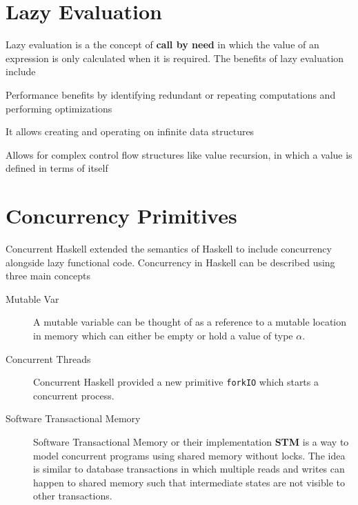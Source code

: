 \section{Lazy Evaluation}
Lazy evaluation is a the concept of \textbf{call by need} in which the value of an expression is only calculated when it is required.
The benefits of lazy evaluation include
\begin{packed_itemize}
\item Performance benefits by identifying redundant or repeating computations and performing optimizations
\item It allows creating and operating on infinite data structures
\item Allows for complex control flow structures like value recursion, in which a value is defined in terms of itself
\end{packed_itemize}

\section{Concurrency Primitives}
Concurrent Haskell\cite{jones1996concurrent} extended the semantics of Haskell to include concurrency alongside lazy functional code.
Concurrency in Haskell can be described using three main concepts
\begin{description}
\item[Mutable Var] A mutable variable can be thought of as a reference to a mutable location in memory which can either be empty or hold
a value of type \textbf{$\alpha$}.
\item[Concurrent Threads] Concurrent Haskell provided a new primitive \texttt{forkIO} which starts a concurrent process.
\item[Software Transactional Memory] Software Transactional Memory or their implementation \textbf{STM}\cite{harris2005composable}
is a way to model concurrent programs using shared memory without locks. The idea is similar to database transactions in which multiple
reads and writes can happen to shared memory such that intermediate states are not visible to other transactions.
\end{description}


